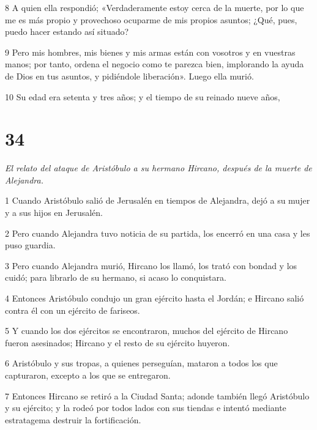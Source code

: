 \par 8 A quien ella respondió; «Verdaderamente estoy cerca de la muerte, por lo que me es más propio y provechoso ocuparme de mis propios asuntos; ¿Qué, pues, puedo hacer estando así situado?

\par 9 Pero mis hombres, mis bienes y mis armas están con vosotros y en vuestras manos; por tanto, ordena el negocio como te parezca bien, implorando la ayuda de Dios en tus asuntos, y pidiéndole liberación». Luego ella murió.

\par 10 Su edad era setenta y tres años; y el tiempo de su reinado nueve años,

\chapter{34}

\par \textit{El relato del ataque de Aristóbulo a su hermano Hircano, después de la muerte de Alejandra.}

\par 1 Cuando Aristóbulo salió de Jerusalén en tiempos de Alejandra, dejó a su mujer y a sus hijos en Jerusalén.

\par 2 Pero cuando Alejandra tuvo noticia de su partida, los encerró en una casa y les puso guardia.

\par 3 Pero cuando Alejandra murió, Hircano los llamó, los trató con bondad y los cuidó; para librarlo de su hermano, si acaso lo conquistara.

\par 4 Entonces Aristóbulo condujo un gran ejército hasta el Jordán; e Hircano salió contra él con un ejército de fariseos.

\par 5 Y cuando los dos ejércitos se encontraron, muchos del ejército de Hircano fueron asesinados; Hircano y el resto de su ejército huyeron.

\par 6 Aristóbulo y sus tropas, a quienes perseguían, mataron a todos los que capturaron, excepto a los que se entregaron.

\par 7 Entonces Hircano se retiró a la Ciudad Santa; adonde también llegó Aristóbulo y su ejército; y la rodeó por todos lados con sus tiendas e intentó mediante estratagema destruir la fortificación.

